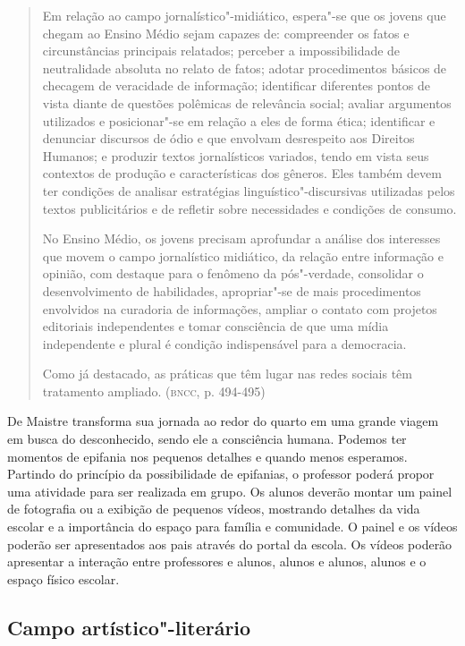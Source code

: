 \documentclass[12pt]{extarticle}
\begin{document}
\begin{quote}
Em relação ao campo jornalístico"-midiático, espera"-se que os jovens
que chegam ao Ensino Médio sejam capazes de: compreender os fatos e
circunstâncias principais relatados; perceber a impossibilidade de
neutralidade absoluta no relato de fatos; adotar procedimentos básicos
de checagem de veracidade de informação; identificar diferentes pontos
de vista diante de questões polêmicas de relevância social; avaliar
argumentos utilizados e posicionar"-se em relação a eles de forma ética;
identificar e denunciar discursos de ódio e que envolvam desrespeito aos
Direitos Humanos; e produzir textos jornalísticos variados, tendo em
vista seus contextos de produção e características dos gêneros. Eles
também devem ter condições de analisar estratégias
linguístico"-discursivas utilizadas pelos textos publicitários e de
refletir sobre necessidades e condições de consumo.

No Ensino Médio, os jovens precisam aprofundar a análise dos interesses
que movem o campo jornalístico midiático, da relação entre informação e
opinião, com destaque para o fenômeno da pós"-verdade, consolidar o
desenvolvimento de habilidades, apropriar"-se de mais procedimentos
envolvidos na curadoria de informações, ampliar o contato com projetos
editoriais independentes e tomar consciência de que uma mídia
independente e plural é condição indispensável para a democracia.

Como já destacado, as práticas que têm lugar nas redes sociais têm
tratamento ampliado. (\textsc{bncc}, p. 494-495)
\end{quote}

De Maistre transforma sua jornada ao redor do quarto em uma grande
viagem em busca do desconhecido, sendo ele a consciência humana.
Podemos ter momentos de epifania nos pequenos detalhes e quando menos
esperamos. Partindo do princípio da possibilidade de epifanias, o
professor poderá propor uma atividade para ser realizada em grupo. Os
alunos deverão montar um painel de fotografia ou a exibição de
pequenos vídeos, mostrando detalhes da vida escolar e a importância do
espaço para família e comunidade. O painel e os vídeos poderão ser
apresentados aos pais através do portal da escola. Os vídeos poderão
apresentar a interação entre professores e alunos, alunos e alunos,
alunos e o espaço físico escolar.

\subsection{Campo artístico"-literário}
\end{document}
